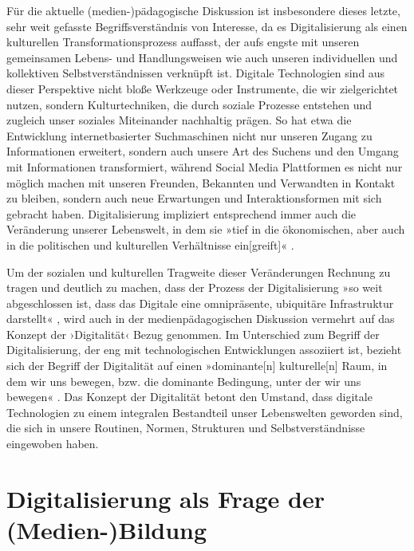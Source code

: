 \documentclass[
  a4paper,
]{book}
\begin{document}
Für die aktuelle (medien-)pädagogische Diskussion ist insbesondere dieses letzte, sehr weit gefasste Begriffsverständnis von Interesse, da es Digitalisierung als einen kulturellen Transformationsprozess auffasst, der aufs engste mit unseren gemeinsamen Lebens- und Handlungsweisen wie auch unseren individuellen und kollektiven Selbstverständnissen verknüpft ist. Digitale Technologien sind aus dieser Perspektive nicht bloße Werkzeuge oder Instrumente, die wir zielgerichtet nutzen, sondern Kulturtechniken, die durch soziale Prozesse entstehen und zugleich unser soziales Miteinander nachhaltig prägen. So hat etwa die Entwicklung internetbasierter Suchmaschinen nicht nur unseren Zugang zu Informationen erweitert, sondern auch unsere Art des Suchens und den Umgang mit Informationen transformiert, während Social Media Plattformen es nicht nur möglich machen mit unseren Freunden, Bekannten und Verwandten in Kontakt zu bleiben, sondern auch neue Erwartungen und Interaktionsformen mit sich gebracht haben. Digitalisierung impliziert entsprechend immer auch die Veränderung unserer Lebenswelt, in dem sie »tief in die ökonomischen, aber auch in die politischen und kulturellen Verhältnisse ein{[}greift{]}« \citep[S. 33]{coyKulturenNichtBetreten2008}.

Um der sozialen und kulturellen Tragweite dieser Veränderungen Rechnung zu tragen und deutlich zu machen, dass der Prozess der Digitalisierung »so weit abgeschlossen ist, dass das Digitale eine omnipräsente, ubiquitäre Infrastruktur darstellt« \citep[S. 69]{jorissenSubjektivationUndAsthetische2018}, wird auch in der medienpädagogischen Diskussion vermehrt auf das Konzept der ›Digitalität‹ Bezug genommen. Im Unterschied zum Begriff der Digitalisierung, der eng mit technologischen Entwicklungen assoziiert ist, bezieht sich der Begriff der Digitalität auf einen »dominante{[}n{]} kulturelle{[}n{]} Raum, in dem wir uns bewegen, bzw. die dominante Bedingung, unter der wir uns bewegen« \citep[S. 4]{stalderWasIstDigitalitaet2021}. Das Konzept der Digitalität betont den Umstand, dass digitale Technologien zu einem integralen Bestandteil unser Lebenswelten geworden sind, die sich in unsere Routinen, Normen, Strukturen und Selbstverständnisse eingewoben haben.

\section{Digitalisierung als Frage der (Medien-)Bildung}\label{digitalisierung-als-frage-der-medien-bildung}
\end{document}
